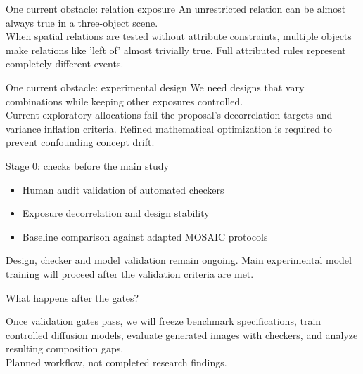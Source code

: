 \documentclass[aspectratio=169,11pt]{beamer}
\newcommand{\captionnote}[1]{{\scriptsize\color{gray}#1}}
\begin{document}
\begin{frame}{One current obstacle: relation exposure}
\Large An unrestricted relation can be almost always true in a three-object scene.
\vspace{4mm}\\
\normalsize When spatial relations are tested without attribute constraints, multiple objects make relations like 'left of' almost trivially true. Full attributed rules represent completely different events.
\end{frame}

\begin{frame}{One current obstacle: experimental design}
\Large We need designs that vary combinations while keeping other exposures controlled.
\vspace{4mm}\\
\normalsize Current exploratory allocations fail the proposal's decorrelation targets and variance inflation criteria. Refined mathematical optimization is required to prevent confounding concept drift.
\end{frame}

\begin{frame}{Stage 0: checks before the main study}
\begin{itemize}
\item Human audit validation of automated checkers
\item Exposure decorrelation and design stability
\item Baseline comparison against adapted MOSAIC protocols
\end{itemize}
\vspace{3mm}
\normalsize Design, checker and model validation remain ongoing. Main experimental model training will proceed after the validation criteria are met.
\end{frame}

\begin{frame}{What happens after the gates?}
\begin{center}\end{center}
\vspace{2mm}
\normalsize Once validation gates pass, we will freeze benchmark specifications, train controlled diffusion models, evaluate generated images with checkers, and analyze resulting composition gaps.
\vspace{1mm}\\\captionnote{Planned workflow, not completed research findings.}
\end{frame}
\end{document}
